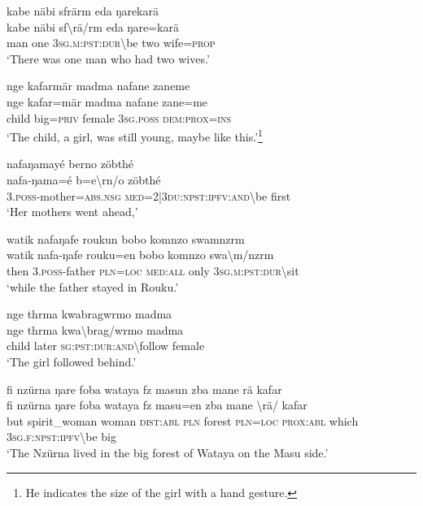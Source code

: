 \ea\label{ex:6:a1201}
kabe näbi sfrärm eda ŋarekarä\\
\gll kabe	näbi	sf{\textbackslash}rä/rm	eda	ŋare=karä\\
     man	one	3\textsc{sg}.\textsc{m}:\textsc{pst}:\textsc{dur}{\textbackslash}be	two	wife=\textsc{prop}\\
\glt `There was one man who had two wives.'
\z

\ea\label{ex:6:a1202}
nge kafarmär madma nafane zaneme\\
\gll nge	kafar=mär	madma	nafane	zane=me\\
     child	big=\textsc{priv}	female	3\textsc{sg}.\textsc{poss}	\textsc{dem}:\textsc{prox}=\textsc{ins}\\
\glt `The child, a girl, was still young, maybe like this.'\footnote{He indicates the size of the girl with a hand gesture.}
\z

\ea\label{ex:6:a1203}
nafaŋamayé berno zöbthé\\
\gll nafa-ŋama=é	b=e{\textbackslash}rn/o	zöbthé\\
     3.\textsc{poss}-mother=\textsc{abs}.\textsc{nsg}	\textsc{med}=2|3\textsc{du}:\textsc{npst}:\textsc{ipfv}:\textsc{and}{\textbackslash}be	first\\
\glt `Her mothers went ahead,'
\z

\ea\label{ex:6:a1204}
watik nafaŋafe roukun bobo komnzo swamnzrm\\
\gll watik	nafa-ŋafe	rouku=en	bobo	komnzo	swa{\textbackslash}m/nzrm\\
     then	3.\textsc{poss}-father	\textsc{pln}=\textsc{loc}	\textsc{med}:\textsc{all}	only	3\textsc{sg}.\textsc{m}:\textsc{pst}:\textsc{dur}{\textbackslash}sit\\
\glt `while the father stayed in Rouku.'
\z

\ea\label{ex:6:a1206}
nge thrma kwabragwrmo madma\\
\gll nge	thrma	kwa{\textbackslash}brag/wrmo	madma\\
     child	later	\textsc{sg}:\textsc{pst}:\textsc{dur}:\textsc{and}{\textbackslash}follow	female\\
\glt `The girl followed behind.'
\z

\ea\label{ex:6:a1207}
fi nzürna ŋare foba wataya fz masun zba mane rä kafar\\
\gll fi	nzürna	ŋare	foba	wataya	fz	masu=en	zba	mane	{\textbackslash}rä/	kafar\\
     but	spirit\_woman	woman	\textsc{dist}:\textsc{abl}	\textsc{pln}	forest	\textsc{pln}=\textsc{loc}	\textsc{prox}:\textsc{abl}	which	3\textsc{sg}.\textsc{f}:\textsc{npst}:\textsc{ipfv}{\textbackslash}be	big\\
\glt `The Nzürna lived in the big forest of Wataya on the Masu side.'
\z


